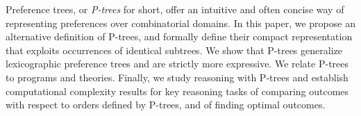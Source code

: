 Preference trees, or \emph{P-trees} for short, offer an intuitive and
often concise way of representing preferences over combinatorial domains. 
In this paper, we propose an alternative definition of P-trees, and 
formally define their compact representation that exploits occurrences 
of identical subtrees. We show that P-trees generalize lexicographic 
preference trees and are strictly more expressive. We relate P-trees 
to  programs and  theories. Finally, we study reasoning with P-trees and 
establish computational complexity results for key reasoning tasks
of comparing outcomes with respect to orders defined by P-trees, and 
of finding optimal outcomes.

